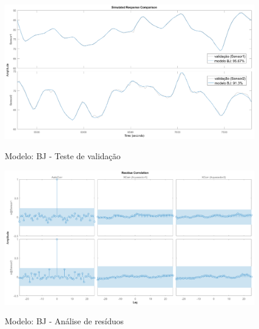 \begin{figure}[h]
	\caption{Modelo: BJ - Teste de validação}
	\begin{center}
		\includegraphics[width=1.00\textwidth]{./5_images/tclabsp-models-BJ-compare.png} 
		\label{fig:tclabsp-models-bj-compare}
	\end{center}
	\centering
\end{figure}

\begin{figure}[h]
	\caption{Modelo: BJ - Análise de resíduos}
	\begin{center}
		\includegraphics[width=1.00\textwidth]{./5_images/tclabsp-models-BJ-resid.png} 
		\label{fig:tclabsp-models-bj-resid}
	\end{center}
	\centering
\end{figure}

